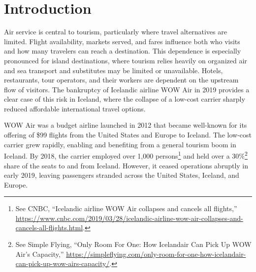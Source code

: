 \documentclass[12pt]{article}
\begin{document}
\hypersetup{pageanchor=true}

\begin{abstract}
This study estimates how the sudden loss of low-cost air service affected visitor flows and labor-market outcomes in Iceland after WOW Air's 2019 bankruptcy. A Bayesian structural time-series model constructs counterfactual paths for Iceland as if the airline had remained in operation. Passenger, employment, unemployment, and wage outcomes are projected using Iceland's pre-bankruptcy trajectory and monthly indicators from nearby Nordic and North Atlantic economies. International passenger departures were 20.6\% lower than the counterfactual, equivalent to about 534,000 fewer passengers, with foreign passengers accounting for over 80\% of the decline. Passenger losses were uneven across nationalities, with some of the largest shortfalls among travelers from markets heavily served by WOW Air. Over the same period, air-transport employment was 25.9\% below expected levels, while tourism employment net of air transport was 6.6\% lower. The results show a substantial decline in foreign passenger flows following the airline's exit, accompanied by measurable short-run deterioration in tourism-facing labor markets.\\
Keywords: tourism shocks; destination vulnerability; transport connectivity; island destinations; tourism labor markets; tourism planning;
\end{abstract}

\section{Introduction}\label{sec:introduction}
Air service is central to tourism, particularly where travel alternatives are limited. Flight availability, markets served, and fares influence both who visits and how many travelers can reach a destination. This dependence is especially pronounced for island destinations, where tourism relies heavily on organized air and sea transport and substitutes may be limited or unavailable. Hotels, restaurants, tour operators, and their workers are dependent on the upstream flow of visitors. The bankruptcy of Icelandic airline WOW Air in 2019 provides a clear case of this risk in Iceland, where the collapse of a low-cost carrier sharply reduced affordable international travel options.

WOW Air was a budget airline launched in 2012 that became well-known for its offering of \$99 flights from the United States and Europe to Iceland. The low-cost carrier grew rapidly, enabling and benefiting from a general tourism boom in Iceland. By 2018, the carrier employed over 1,000 persons\footnote{See CNBC, ``Icelandic airline WOW Air collapses and cancels all flights,'' \url{https://www.cnbc.com/2019/03/28/icelandic-airline-wow-air-collapses-and-cancels-all-flights.html}.} and held over a 30\%\footnote{See Simple Flying, ``Only Room For One: How Icelandair Can Pick Up WOW Air's Capacity,'' \url{https://simpleflying.com/only-room-for-one-how-icelandair-can-pick-up-wow-airs-capacity/}.} share of the seats to and from Iceland. However, it ceased operations abruptly in early 2019, leaving passengers stranded across the United States, Iceland, and Europe.
\end{document}
